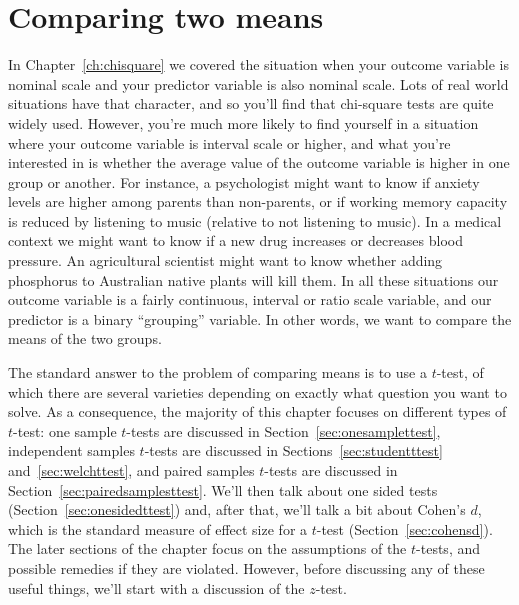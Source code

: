 

\chapter{Comparing two means \label{ch:ttest}}

In Chapter~\ref{ch:chisquare} we covered the situation when your outcome variable is nominal scale and your predictor variable is also nominal scale. Lots of real world situations have that character, and so you'll find that chi-square tests are quite widely used. However, you're much more likely to find yourself in a situation where your outcome variable is interval scale or higher, and what you're interested in is whether the average value of the outcome variable is higher in one group or another. For instance, a psychologist might want to know if anxiety levels are higher among parents than non-parents, or if working memory capacity is reduced by listening to music (relative to not listening to music). In a medical context we might want to know if a new drug increases or decreases blood pressure. An agricultural scientist might want to know whether adding phosphorus to Australian native plants will kill them. In all these situations our outcome variable is a fairly continuous, interval or ratio scale variable, and our predictor is a binary ``grouping'' variable. In other words, we want to compare the means of the two groups. 

The standard answer to the problem of comparing means is to use a $t$-test, of which there are several varieties depending on exactly what question you want to solve. As a consequence, the majority of this chapter focuses on different types of $t$-test: one sample $t$-tests are discussed in Section~\ref{sec:onesamplettest}, independent samples $t$-tests are discussed in Sections~\ref{sec:studentttest} and~\ref{sec:welchttest}, and paired samples $t$-tests are discussed in Section~\ref{sec:pairedsamplesttest}. We'll then talk about one sided tests (Section~\ref{sec:onesidedttest}) and, after that, we'll talk a bit about Cohen's $d$, which is the standard measure of effect size for a $t$-test (Section~\ref{sec:cohensd}). The later sections of the chapter focus on the assumptions of the $t$-tests, and possible remedies if they are violated. However, before discussing any of these useful things, we'll start with a discussion of the $z$-test. 


